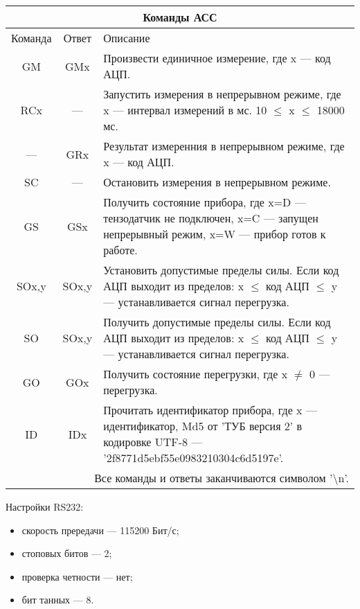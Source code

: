 \begin{tabular}{|c|c|p{10cm}|}
\hline
\multicolumn{3}{|c|}{\textbf{Команды АСС}} \\
\hline
Команда & Ответ & Описание \\
\hline
GM & GMx & Произвести единичное измерение, где x --- код АЦП.\\
\hline
RCx & --- & Запустить измерения в непрерывном режиме, где x --- интервал
измерений в мс. 10 $\leq$ x $\leq$ 18000 мс.\\
\hline
--- & GRx & Результат измеренния в непрерывном режиме, где x --- код АЦП.\\
\hline
SC & --- & Остановить измерения в непрерывном режиме.\\
\hline
GS & GSx & Получить состояние прибора, где x=D --- тензодатчик не подключен, x=C
--- запущен непрерывный режим, x=W --- прибор готов к работе.\\
\hline
SOx,y & SOx,y & Установить допустимые пределы силы.
Если код АЦП выходит из пределов: x $\leq$ код АЦП $\leq$ y --- устанавливается
сигнал перегрузка.\\
\hline
SO & SOx,y & Получить допустимые пределы силы.
Если код АЦП выходит из пределов: x $\leq$ код АЦП $\leq$ y --- устанавливается
сигнал перегрузка.\\
\hline
GO & GOx & Получить состояние перегрузки, где x $\neq$ 0 --- перегрузка.\\
\hline
ID & IDx & Прочитать идентификатор прибора, где x --- идентификатор, Md5 от 'ТУБ
версия 2' в кодировке UTF-8 --- '2f8771d5ebf55e0983210304c6d5197e'.\\ \hline
\multicolumn{3}{r}{Все команды и ответы заканчиваются символом '\textbackslash n'.} \\
\end{tabular}

Настройки RS232:
\begin{itemize}
\item скорость прередачи --- 115200 Бит/с;
\item стоповых битов --- 2;
\item проверка четности --- нет;
\item бит танных --- 8.
\end{itemize}